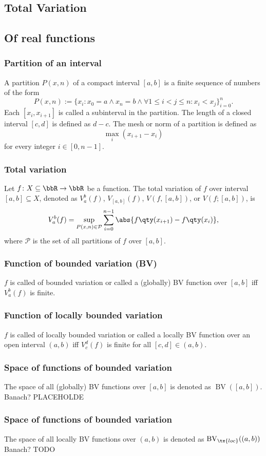 \documentclass[a4paper,12pt]{report}
\begin{document}
\begin{itemize}
\begin{itemize}
\section{Total Variation}
\subsection{Of real functions}
\subsubsection{Partition of an interval}
A partition $P(x, n)$ of a compact interval $[a,b]$ is a finite sequence of numbers of the form
\[P(x, n):=\{x_i\colon x_0=a\land x_n=b\land\forall 1\leq i<j\leq n\colon x_i<x_j\}_{i=0}^n.\]
Each $[x_i, x_{i+1}]$ is called a subinterval in the partition. The length of a closed interval $[c,d]$ is defined as $d-c$. The mesh or norm of a partition is defined as
\[\max_i\left(x_{i+1}-x_{i}\right)\]
for every integer $i\in [0,n-1]$.
\subsubsection{Total variation}
Let $f\colon X\subseteq\bbR\to\bbR$ be a function. The total variation of $f$ over interval $[a,b]\subseteq X$, denoted as $V_a^b(f)$, $V_{[a,b]}(f)$, $V(f,[a,b])$, or $V(f;[a,b])$, is
\[V_a^b(f)=\sup_{P(x,n)\in\mathcal{P}}\sum_{i=0}^{n-1}\abs{f\qty(x_{i+1})-f\qty(x_i)},\]
where $\mathcal{P}$ is the set of all partitions of $f$ over $[a,b]$.
\subsubsection{Function of bounded variation (BV)}
$f$ is called of bounded variation or called a (globally) BV function over $[a,b]$ iff $V_a^b(f)$ is finite.
\subsubsection{Function of locally bounded variation}
$f$ is called of locally bounded variation or called a locally BV function over an open interval $(a,b)$ iff $V_c^d(f)$ is finite for all $[c,d]\in (a,b)$.
\subsubsection{Space of functions of bounded variation}
The space of all (globally) BV functions over $[a,b]$ is denoted as $\operatorname{BV}([a,b])$.
Banach?
PLACEHOLDE 
\subsubsection{Space of functions of bounded variation}
The space of all locally BV functions over $(a,b)$ is denoted as $\operatorname{BV}_{\tx{loc}}((a,b))$
Banach?
TODO

\end{itemize}
\end{itemize}
\end{document}
